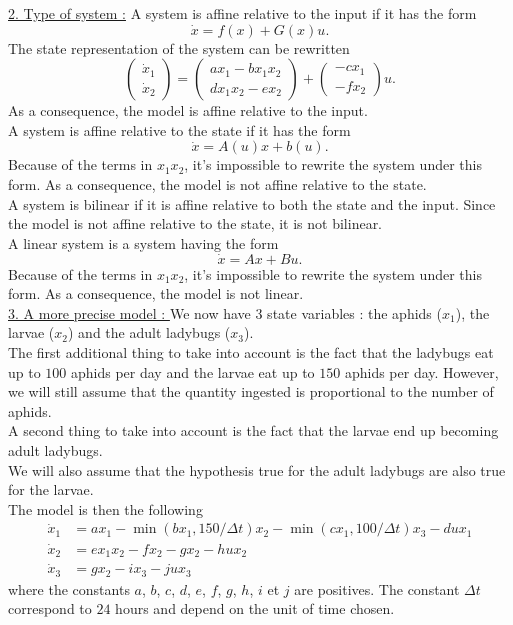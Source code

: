\underline{2. Type of system :}
A system is affine relative to the input if it has the form $$\dot{x} = f(x) + G(x)u.$$
The state representation of the system can be rewritten
$$\begin{pmatrix}
\dot{x}_1\\
\dot{x}_2
\end{pmatrix} =
\begin{pmatrix}
ax_1 - bx_1x_2\\
dx_1x_2 - ex_2
\end{pmatrix} +
\begin{pmatrix}
-cx_1\\
-fx_2
\end{pmatrix}u.$$
As a consequence, the model is affine relative to the input.\\
A system is affine relative to the state if it has the form $$\dot{x} = A(u)x + b(u).$$
Because of the terms in $x_1x_2$, it's impossible to rewrite the system under this form. As a consequence, the model is not affine relative to the state.\\
A system is bilinear if it is affine relative to both the state and the input. Since the model is not affine relative to the state, it is not bilinear.\\
A linear system is a system having the form $$\dot{x} = Ax + Bu.$$
Because of the terms in $x_1x_2$, it's impossible to rewrite the system under this form. As a consequence, the model is not linear.\\

\underline{3. A more precise model : }
We now have $3$ state variables : the aphids ($x_1$), the larvae ($x_2$) and the adult ladybugs ($x_3$).\\
The first additional thing to take into account is the fact that the ladybugs eat up to $100$ aphids per day and the larvae eat up to $150$ aphids per day. However, we will still assume that the quantity ingested is proportional to the number of aphids.\\
A second thing to take into account is the fact that the larvae end up becoming adult ladybugs.\\
We will also assume that the hypothesis true for the adult ladybugs are also true for the larvae.\\
The model is then the following
\begin{align*}
\dot{x}_1 & = ax_1 - \min(bx_1,150/\Delta t)x_2 - \min(cx_1,100/\Delta t)x_3 -dux_1\\
\dot{x}_2 & = ex_1x_2 - fx_2 - gx_2 -hux_2\\
\dot{x}_3 & = gx_2 - ix_3 -jux_3
\end{align*}
where the constants $a$, $b$, $c$, $d$, $e$, $f$, $g$, $h$, $i$ et $j$ are positives. The constant $\Delta t$ correspond to $24$ hours and depend on the unit of time chosen.